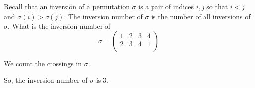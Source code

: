 \documentclass{article}
\begin{document}
\begin{problem}
Recall that an inversion of a permutation $\sigma$ is a pair of indices $i, j$ so that $i < j$ and $\sigma(i) > \sigma(j)$.
The inversion number of $\sigma$ is the number of all inversions of $\sigma$.
What is the inversion number of
\[
	\sigma = \begin{pmatrix}
		1 & 2 & 3 & 4 \\
		2 & 3 & 4 & 1 \\
	\end{pmatrix}
\]
\end{problem}
\begin{solution}
	We count the crossings in $\sigma$.
	\begin{center}
	\end{center}
	So, the inversion number of $\sigma$ is 3.
\end{solution}
\end{document}
